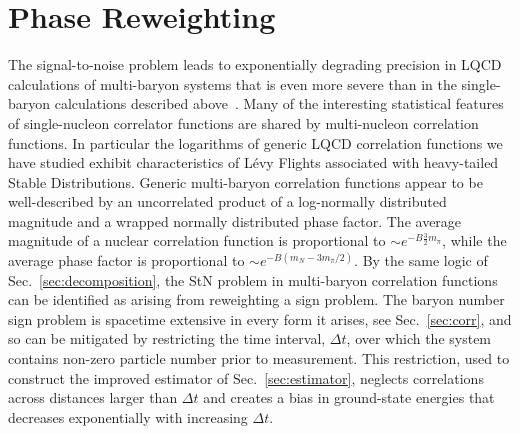 \chapter{Phase Reweighting}\label{chap:PR}
 


The signal-to-noise problem leads to exponentially degrading precision in LQCD calculations of multi-baryon systems
that is even more severe than in the single-baryon calculations described above~\cite{Beane:2010em}.
Many of the interesting statistical features~\cite{Parisi:1983ae,Hamber:1983vu,Lepage:1989hd,Beane:2009kya,Beane:2009gs,Beane:2010em,Endres:2011jm,Endres:2011er,Endres:2011mm,Lee:2011sm,DeGrand:2012ik,Grabowska:2012ik,Nicholson:2012xt,Beane:2014oea} of single-nucleon correlator functions are shared by multi-nucleon correlation functions.
In particular the logarithms of generic LQCD correlation functions we have studied exhibit characteristics of L{\'e}vy Flights associated with 
heavy-tailed Stable Distributions.
Generic multi-baryon correlation functions appear to be well-described by an uncorrelated product of a log-normally distributed magnitude and a wrapped normally distributed phase factor.
The average magnitude of a nuclear correlation function is proportional to $\sim e^{-B \frac{3}{2}m_\pi}$, while the average phase factor is proportional to $\sim e^{-B(m_N-3 m_\pi /2)}$.
By the same logic of Sec.~\ref{sec:decomposition}, the StN problem in multi-baryon correlation functions can be identified as arising from reweighting a sign problem.
The baryon number sign problem is spacetime extensive in every form it arises, see Sec.~\ref{sec:corr}, and so can be mitigated by restricting the time interval, $\Delta t$, over which the system contains non-zero particle number prior to measurement.
This restriction, used to construct the improved estimator of Sec.~\ref{sec:estimator}, neglects correlations across distances larger than $\Delta t$
and creates a bias in ground-state energies that decreases exponentially with increasing $\Delta t$.

